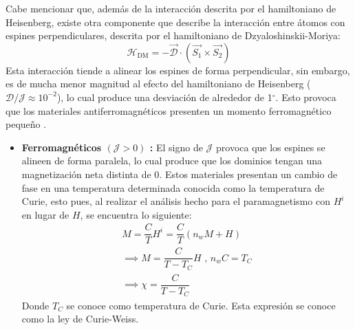 \documentclass[../main.tex]{subfiles}
\begin{document}
Cabe mencionar que, además de la interacción descrita por el hamiltoniano de Heisenberg, existe otra componente que describe la interacción entre átomos con espines perpendiculares, descrita por el hamiltoniano de Dzyaloshinskii-Moriya:
\begin{equation}
    \mathcal{H}_\text{DM}=-\vec{\mathcal{D}}\cdot\left(\vec{S_1}\times\vec{S_2}\right)
    \label{eq:hamiltonianoDM}
\end{equation}
Esta interacción tiende a alinear los espines de forma perpendicular, sin embargo, es de mucha menor magnitud al efecto del hamiltoniano de Heisenberg ($\mathcal{D}/\mathcal{J}\approx10^{-2}$), lo cual produce una desviación de alrededor de 1$^\circ$. Esto provoca que los materiales antiferromagnéticos presenten un momento ferromagnético pequeño \cite{coey2010magnetism} \cite{Dzyaloshinsky1958}.
\begin{itemize}
    \item \textbf{Ferromagnéticos $(\mathcal{J}>0)$ :} El signo de $\mathcal{J}$ provoca que los espines se alineen de forma paralela, lo cual produce que los dominios tengan una magnetización neta distinta de 0. Estos materiales presentan un cambio de fase en una temperatura determinada conocida como la temperatura de Curie, esto pues, al realizar el análisis hecho para el paramagnetismo con $H^i$ en lugar de $H$, se encuentra lo siguiente:
    \begin{equation}\begin{split}
        M=\dfrac{C}{T}H^i=\dfrac{C}{T}(n_wM+H)\\
        \implies M=\dfrac{C}{T-T_C}H\text{ , }n_wC=T_C\\
        \implies \chi=\dfrac{C}{T-T_C}
    \end{split}
        \label{eq:leycurieweiss}
    \end{equation}
    Donde $T_C$ se conoce como temperatura de Curie. Esta expresión se conoce como la ley de Curie-Weiss.


\end{itemize}
\end{document}
